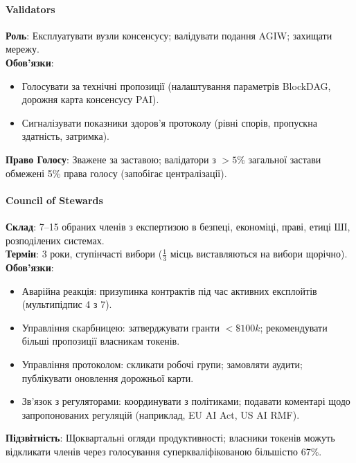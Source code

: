 \documentclass[11pt]{article}
\begin{document}
\paragraph{Validators}
\textbf{Роль}: Експлуатувати вузли консенсусу; валідувати подання AGIW; захищати мережу.\\
\textbf{Обов'язки}:
\begin{itemize}[noitemsep]
  \item Голосувати за технічні пропозиції (налаштування параметрів BlockDAG, дорожня карта консенсусу PAI).
  \item Сигналізувати показники здоров'я протоколу (рівні спорів, пропускна здатність, затримка).
\end{itemize}
\textbf{Право Голосу}: Зважене за заставою; валідатори з $>5\%$ загальної застави обмежені 5\% права голосу (запобігає централізації).

\paragraph{Council of Stewards}
\textbf{Склад}: 7--15 обраних членів з експертизою в безпеці, економіці, праві, етиці ШІ, розподілених системах.\\
\textbf{Термін}: 3 роки, ступінчасті вибори ($\frac{1}{3}$ місць виставляються на вибори щорічно).\\
\textbf{Обов'язки}:
\begin{itemize}[noitemsep]
  \item Аварійна реакція: призупинка контрактів під час активних експлойтів (мультипідпис 4 з 7).
  \item Управління скарбницею: затверджувати гранти $<\$100k$; рекомендувати більші пропозиції власникам токенів.
  \item Управління протоколом: скликати робочі групи; замовляти аудити; публікувати оновлення дорожньої карти.
  \item Зв'язок з регуляторами: координувати з політиками; подавати коментарі щодо запропонованих регуляцій (наприклад, EU AI Act, US AI RMF).
\end{itemize}
\textbf{Підзвітність}: Щоквартальні огляди продуктивності; власники токенів можуть відкликати членів через голосування суперкваліфікованою більшістю 67\%.
\end{document}
